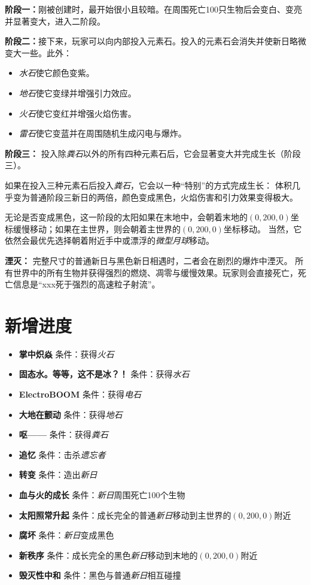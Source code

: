 \documentclass[11pt]{article}
\begin{document}
    \textbf{阶段一：}刚被创建时，最开始很小且较暗。在周围死亡100只生物后会变白、变亮并显著变大，进入二阶段。

    \textbf{阶段二：}接下来，玩家可以向内部投入元素石。投入的元素石会消失并使新日略微变大一些。此外：
    \begin{itemize}
        \item \textit{水石}使它颜色变紫。
        \item \textit{地石}使它变绿并增强引力效应。
        \item \textit{火石}使它变红并增强火焰伤害。
        \item \textit{雷石}使它变蓝并在周围随机生成闪电与爆炸。
    \end{itemize}

    \textbf{阶段三：}
    投入除\textit{粪石}以外的所有四种元素石后，它会显著变大并完成生长（阶段三）。

    如果在投入三种元素石后投入\textit{粪石}，它会以一种“特别”的方式完成生长：
    体积几乎变为普通阶段三新日的两倍，颜色变成黑色，火焰伤害和引力效果变得极大。

    无论是否变成黑色，这一阶段的太阳如果在末地中，会朝着末地的$(0, 200, 0)$坐标缓慢移动；如果在主世界，则会朝着主世界的$(0, 200, 0)$坐标移动。
    当然，它依然会最优先选择朝着附近手中或漂浮的\textit{微型月球}移动。

    \textbf{湮灭：}
    完整尺寸的普通新日与黑色新日相遇时，二者会在剧烈的爆炸中湮灭。
    所有世界中的所有生物并获得强烈的燃烧、凋零与缓慢效果。玩家则会直接死亡，死亡信息是“xxx死于强烈的高速粒子射流”。

    \clearpage
    \section{新增进度}\label{sec:achievements}
    \begin{itemize}
        \item \textbf{掌中炽焱} \quad 条件：获得\textit{火石}
        \item \textbf{固态水。等等，这不是冰？！} \quad 条件：获得\textit{水石}
        \item \textbf{ElectroBOOM} \quad 条件：获得\textit{电石}
        \item \textbf{大地在颤动} \quad 条件：获得\textit{地石}
        \item \textbf{呕——} \quad 条件：获得\textit{粪石}
        \item \textbf{追忆} \quad 条件：击杀\textit{遗忘者}
        \item \textbf{转变} \quad 条件：造出\textit{新日}
        \item \textbf{血与火的成长} \quad 条件：\textit{新日}周围死亡100个生物
        \item \textbf{太阳照常升起} \quad 条件：成长完全的普通\textit{新日}移动到主世界的$(0, 200, 0)$附近
        \item \textbf{腐坏} \quad 条件：\textit{新日}变成黑色
        \item \textbf{新秩序} \quad 条件：成长完全的黑色\textit{新日}移动到末地的$(0, 200, 0)$附近
        \item \textbf{毁灭性中和} \quad 条件：黑色与普通\textit{新日}相互碰撞
    \end{itemize}
\end{document}

